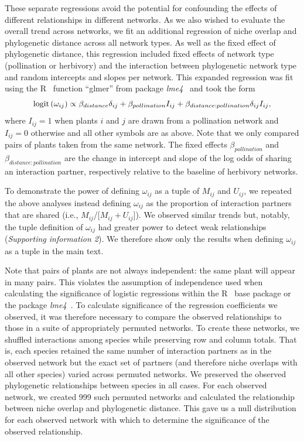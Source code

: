 \documentclass[12pt]{article}
\begin{document}
\begin{spacing}{1.5}
    These separate regressions avoid the potential for confounding the effects
    of different relationships in different networks. As we also wished to 
    evaluate the overall trend across networks, we fit an additional
    regression of niche overlap and phylogenetic distance across all network 
    types. As well as the fixed effect of phylogenetic distance, this 
    regression included fixed effects of network type (pollination or 
    herbivory) and the interaction between phylogenetic network type and 
    random intercepts and slopes per network. This expanded regression was fit
    using the R~\citep{R} function ``glmer'' from package 
    \emph{lme4}~\citep{lme4} and took the form
      \begin{equation}
        {\rm logit}\left(\omega_{ij}\right) \propto \beta_{distance} \delta_{ij} + \beta_{pollination} I_{ij} + \beta_{distance:pollination} \delta_{ij} I_{ij} ,
      \end{equation}
    where $I_{ij}=1$ when plants $i$ and $j$ are drawn from a 
    pollination network and $I_{ij}=0$ otherwise and all other symbols 
    are as above. Note that we only compared pairs of plants taken from the 
    same network. The fixed effects $\beta_{pollination}$ and $\beta_{distance:pollination}$ 
    are the change in intercept and slope of the log odds of sharing an 
    interaction partner, respectively relative to the baseline of 
    herbivory networks.


    To demonstrate the power of defining $\omega_{ij}$ as a tuple of $M_{ij}$ and $U_{ij}$, we repeated the above analyses instead defining $\omega_{ij}$ as the proportion of interaction partners that are shared (i.e., $M_{ij}$/[$M_{ij}+U_{ij}$]). We observed similar trends but, notably, the tuple definition of $\omega_{ij}$ had greater power to detect weak relationships (\emph{Supporting information 2}). We therefore show only the results when defining $\omega_{ij}$ as a tuple in the main text.


    Note that pairs of plants are not always independent: the same plant will 
    appear in many pairs. This violates the assumption of independence used 
    when calculating the significance of logistic regressions within 
    the R~\citep{R} base package or the package \emph{lme4}~\citep{lme4}. To 
    calculate significance of the regression coefficients we observed, it was 
    therefore necessary to compare the observed relationships to those in a 
    suite of appropriately permuted networks. To create these networks, we 
    shuffled interactions among species while preserving row and column 
    totals. That is, each species retained the same number of interaction 
    partners as in the observed network but the exact set of partners (and 
    therefore niche overlaps with all other species) varied across permuted 
    networks. We preserved the observed phylogenetic relationships between 
    species in all cases. For each observed network, we created 999 such 
    permuted networks and calculated the relationship between niche overlap 
    and phylogenetic distance. This gave us a null distribution for each 
    observed network with which to determine the significance of the observed 
    relationship.



\end{spacing}
\end{document}
